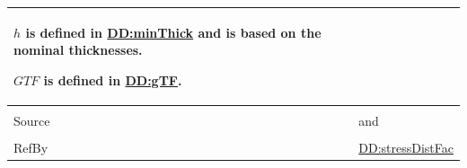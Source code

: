 \documentclass[12pt]{article}
\begin{document}
\begin{minipage}{\textwidth}
\begin{tabular}{>{\raggedright}p{}>{\raggedright\arraybackslash}p{}}
        $h$ is defined in \hyperref[DD:minThick]{DD:minThick} and is based on the nominal thicknesses.
        
        $\mathit{GTF}$ is defined in \hyperref[DD:gTF]{DD:gTF}.
        
\\ \midrule \\
Source & \cite{astm2009} and \cite[(Eq. 7)]{campidelli}
         
\\ \midrule \\
RefBy & \hyperref[DD:stressDistFac]{DD:stressDistFac}
        
\\ \bottomrule
\end{tabular}
\end{minipage}
\end{document}
